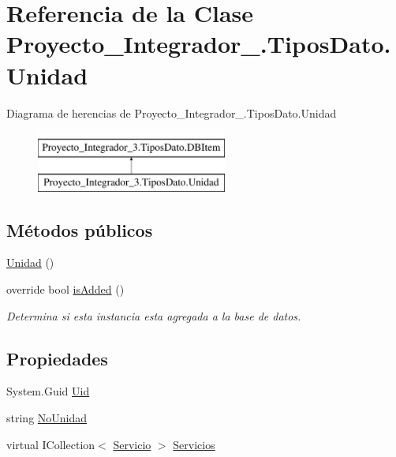 \hypertarget{class_proyecto___integrador__3_1_1_tipos_dato_1_1_unidad}{\section{Referencia de la Clase Proyecto\-\_\-\-Integrador\-\_.\-Tipos\-Dato.\-Unidad}
\label{class_proyecto___integrador__3_1_1_tipos_dato_1_1_unidad}
}
Diagrama de herencias de Proyecto\-\_\-\-Integrador\-\_.\-Tipos\-Dato.\-Unidad\begin{figure}[H]
\begin{center}
\leavevmode
\includegraphics[height=2.000000cm]{class_proyecto___integrador__3_1_1_tipos_dato_1_1_unidad}
\end{center}
\end{figure}
\subsection*{Métodos públicos}
\begin{DoxyCompactItemize}
\item 
\hyperlink{class_proyecto___integrador__3_1_1_tipos_dato_1_1_unidad_adcd7f607349eab8b07b34e7761b78aaa}{Unidad} ()
\item 
override bool \hyperlink{class_proyecto___integrador__3_1_1_tipos_dato_1_1_unidad_a6566d517c25b9048021422510c544611}{is\-Added} ()
\begin{DoxyCompactList}\small\item\em Determina si esta instancia esta agregada a la base de datos. \end{DoxyCompactList}\end{DoxyCompactItemize}
\subsection*{Propiedades}
\begin{DoxyCompactItemize}
\item 
System.\-Guid \hyperlink{class_proyecto___integrador__3_1_1_tipos_dato_1_1_unidad_aa2e602251694986f3d519ee3db5ffa38}{Uid}
\item 
string \hyperlink{class_proyecto___integrador__3_1_1_tipos_dato_1_1_unidad_a75d59e9f06c1422def3f8630d2a33642}{No\-Unidad}
\item 
virtual I\-Collection$<$ \hyperlink{class_proyecto___integrador__3_1_1_tipos_dato_1_1_servicio}{Servicio} $>$ \hyperlink{class_proyecto___integrador__3_1_1_tipos_dato_1_1_unidad_aca85e685e50da0af6be67e3ee69b1bb1}{Servicios}
\end{DoxyCompactItemize}
